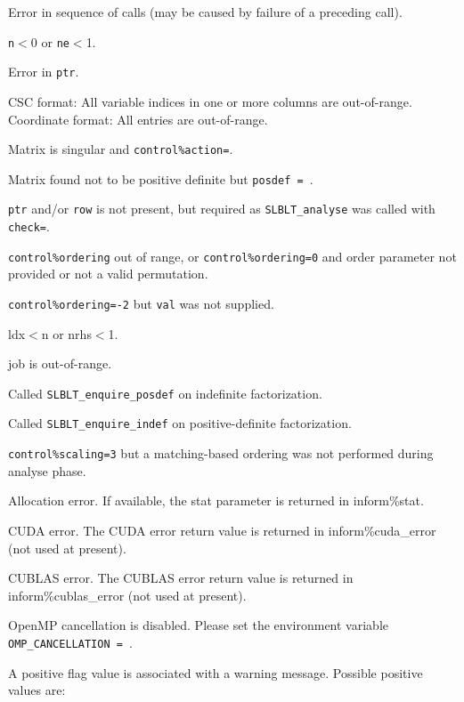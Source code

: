 \documentclass{galahad}
\newcommand{\packagename}{SLBLT}
\begin{document}
\begin{description}

Error in sequence of calls (may be caused by failure of a preceding call).

{\tt n}$<$0 or {\tt ne}$<$1.

Error in {\tt ptr}.

 CSC format: All variable indices in one or more columns are
out-of-range.
Coordinate format: All entries are out-of-range.

Matrix is singular and {\tt control\%action=\false}.

Matrix found not to be positive definite but {\tt posdef = \true}.

{\tt ptr} and/or {\tt row} is not present, but required as
{\tt \packagename\_analyse} was called with {\tt check=\false}.

{\tt control\%ordering} out of range, or {\tt control\%ordering=0} and
order parameter not provided or not a valid permutation.

{\tt control\%ordering=-2} but {\tt val} was not supplied.

ldx$<$n or nrhs$<$1.

job is out-of-range.

Called {\tt \packagename\_enquire\_posdef} on indefinite
factorization.

Called {\tt \packagename\_enquire\_indef} on positive-definite
factorization.

{\tt control\%scaling=3} but a matching-based ordering was not
performed during analyse phase.

Allocation error. If available, the stat parameter is
returned in inform\%stat.

CUDA error. The CUDA error return value is returned in
inform\%cuda\_error (not used at present).

CUBLAS error. The CUBLAS error return value is returned in
inform\%cublas\_error (not used at present).

OpenMP cancellation is disabled. Please set the environment
variable {\tt OMP\_CANCELLATION = \true}.

\end{description} 

A positive flag value is associated with a warning message.
Possible positive values are: 
 
\end{document}
